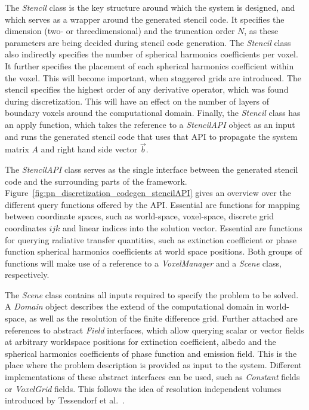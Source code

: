 The \emph{Stencil} class is the key structure around which the system is designed, and which serves as a wrapper around the generated stencil code. It specifies the dimension (two- or threedimensional) and the truncation order $N$, as these parameters are being decided during stencil code generation. The \emph{Stencil} class also indirectly specifies the number of spherical harmonics coefficients per voxel. It further specifies the placement of each spherical harmonics coefficient within the voxel. This will become important, when staggered grids are introduced. The stencil specifies the highest order of any derivative operator, which was found during discretization. This will have an effect on the number of layers of boundary voxels around the computational domain. Finally, the \emph{Stencil} class has an apply function, which takes the reference to a \emph{StencilAPI} object as an input and runs the generated stencil code that uses that API to propagate the system matrix $A$ and right hand side vector $\vec{b}$.

The \emph{StencilAPI} class serves as the single interface between the generated stencil code and the surrounding parts of the framework. Figure~\ref{fig:pn_discretization_codegen_stencilAPI} gives an overview over the different query functions offered by the API. Essential are functions for mapping between coordinate spaces, such as world-space, voxel-space, discrete grid coordinates $ijk$ and linear indices into the solution vector. Essential are functions for querying radiative transfer quantities, such as extinction coefficient or phase function spherical harmonics coefficients at world space positions. Both groups of functions will make use of a reference to a \emph{VoxelManager} and a \emph{Scene} class, respectively.

The \emph{Scene} class contains all inputs required to specify the problem to be solved. A \emph{Domain} object describes the extend of the computational domain in world-space, as well as the resolution of the finite difference grid. Further attached are references to abstract \emph{Field} interfaces, which allow querying scalar or vector fields at arbitrary worldspace positions for extinction coefficient, albedo and the spherical harmonics coefficients of phase function and emission field. This is the place where the problem description is provided as input to the system. Different implementations of these abstract interfaces can be used, such as \emph{Constant} fields or \emph{VoxelGrid} fields. This follows the idea of resolution independent volumes introduced by Tessendorf et al.~\cite{Tessendorf11}.

